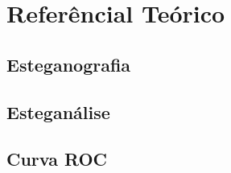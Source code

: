 \chapter{Referêncial Teórico}

\section{Esteganografia}

\section{Esteganálise}

\section{Curva ROC}
